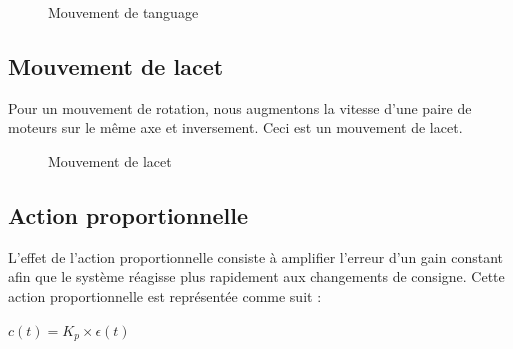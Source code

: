\documentclass[a4paper,12pt]{report}
\begin{document}
	
	\begin{figure}[h] 
	\begin{center}
		\centering
	\end{center}
	\caption{Mouvement de tanguage}
	\end{figure}
	
	\subsection{Mouvement de lacet}
	Pour un mouvement de rotation, nous augmentons la vitesse d’une paire de moteurs sur le même axe et inversement. Ceci est un mouvement de lacet.
	\begin{figure} [h]
	\begin{center}
	\end{center}
	\caption{Mouvement de lacet}	
\end{figure}
\newpage
\subsection {Action proportionnelle}
L’effet de l’action proportionnelle consiste à amplifier l’erreur d’un gain constant afin que le
système réagisse plus rapidement aux changements de consigne. Cette action proportionnelle est
représentée comme suit :

$ c(t) = K_p\times \epsilon(t) $
\end{document}
